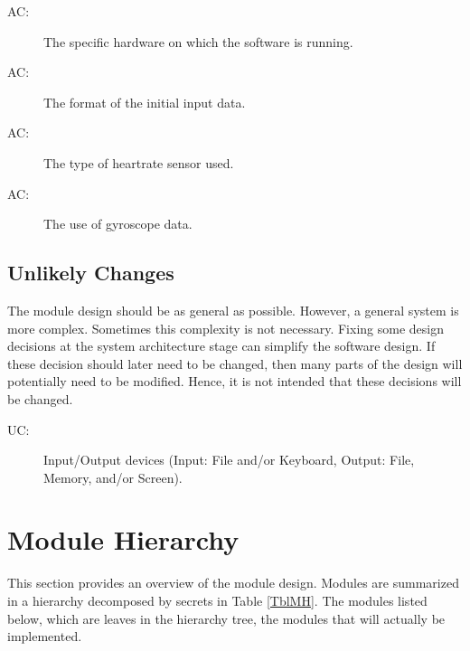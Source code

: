 \documentclass[12pt, titlepage]{article}
\newcounter{acnum}
\newcommand{\actheacnum}{AC\theacnum}
\newcounter{ucnum}
\newcommand{\uctheucnum}{UC\theucnum}
\begin{document}
\begin{description}
  \item[ \actheacnum \label{acHardware}:] The specific
    hardware on which the software is running.
  \item[ \actheacnum \label{acInput}:] The format of the
    initial input data.
  \item[ \actheacnum \label{acSensor}:] The type of heartrate sensor used.
\item[ \actheacnum \label{acData}:] The use of gyroscope data.
\end{description}

\subsection{Unlikely Changes} \label{SecUchange}

The module design should be as general as possible. However, a general system is
more complex. Sometimes this complexity is not necessary. Fixing some design
decisions at the system architecture stage can simplify the software design. If
these decision should later need to be changed, then many parts of the design
will potentially need to be modified. Hence, it is not intended that these
decisions will be changed.

\begin{description}
  \item[ \uctheucnum \label{ucIO}:] Input/Output devices
    (Input: File and/or Keyboard, Output: File, Memory, and/or Screen).
\end{description}

\section{Module Hierarchy} \label{SecMH}

This section provides an overview of the module design. Modules are summarized
in a hierarchy decomposed by secrets in Table \ref{TblMH}. The modules listed
below, which are leaves in the hierarchy tree, the modules that will
actually be implemented.
\end{document}
